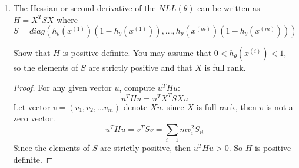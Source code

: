 \documentclass[]{book}
\theoremstyle{definition}
\begin{document}
\begin{enumerate}
\begin{proof}
	\end{proof}
	
	\item 
	The Hessian or second derivative of the $NLL(\theta)$ can be written as $H=X^{T}SX$ where
	$$S=diag(h_{\theta}(x^{(1)})(1-h_{\theta}(x^{(1)})),...,h_{\theta}(x^{(m)})(1-h_{\theta}(x^{(m)})))$$
	
	Show that $H$ is positive definite. You may assume that $0 < h_{\theta}(x^{(i)}) < 1$, so the elements of $S$ are strictly positive and that $X$ is full rank.
	
	\begin{proof}
		For any given vector $u$, compute $u^THu$:
		$$u^THu = u^TX^TSXu $$
		Let vector $v = (v_1, v_2,...v_m)$ denote $X\dot u$. since $X$ is full rank, then $v$ is not a zero vector.
		$$u^THu = v^TSv = \sum_{i=1}{m} v_i^2S_{ii}$$
		Since the elements of $S$ are strictly positive, then $u^THu > 0$. So $H$ is positive definite.
	\end{proof}
	
\end{enumerate}
\end{document}
